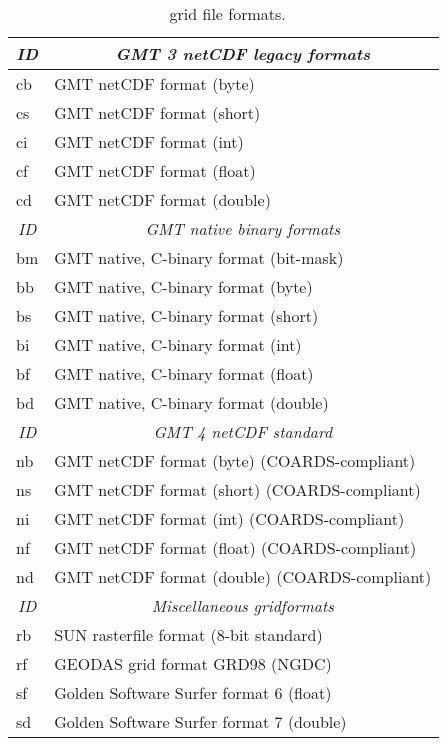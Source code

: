 \begin{table}[H]
\centering
\begin{tabular}{|l|l|} \hline
\multicolumn{1}{|c|}{\emph{ID}}	&	\multicolumn{1}{c|}{\emph{GMT 3 netCDF legacy formats}} \\ \hline \hline
cb & GMT netCDF format (byte)	 \\ \hline
cs & GMT netCDF format (short)	 \\ \hline
ci & GMT netCDF format (int)	 \\ \hline
cf & GMT netCDF format (float)	 \\ \hline
cd & GMT netCDF format (double)	 \\ \hline \hline
\multicolumn{1}{|c|}{\emph{ID}}	&	\multicolumn{1}{c|}{\emph{GMT native binary formats}} \\ \hline \hline
bm & GMT native, C-binary format (bit-mask)	\\ \hline
bb & GMT native, C-binary format (byte)		\\ \hline
bs & GMT native, C-binary format (short)	\\ \hline
bi & GMT native, C-binary format (int)		\\ \hline
bf & GMT native, C-binary format (float)	\\ \hline
bd & GMT native, C-binary format (double)	\\ \hline \hline
\multicolumn{1}{|c|}{\emph{ID}}	&	\multicolumn{1}{c|}{\emph{GMT 4 netCDF standard}} \\ \hline \hline
nb & GMT netCDF format (byte)   (COARDS-compliant)		\\ \hline
ns & GMT netCDF format (short)  (COARDS-compliant)		\\ \hline
ni & GMT netCDF format (int)    (COARDS-compliant)		\\ \hline
nf & GMT netCDF format (float)  (COARDS-compliant)		\\ \hline
nd & GMT netCDF format (double) (COARDS-compliant) 		\\ \hline \hline
\multicolumn{1}{|c|}{\emph{ID}}	&	\multicolumn{1}{c|}{\emph{Miscellaneous gridformats}} \\ \hline \hline
rb & SUN rasterfile format (8-bit standard)	\\ \hline
rf & GEODAS grid format GRD98 (NGDC)		\\ \hline
sf & Golden Software Surfer format 6 (float)	\\ \hline
sd & Golden Software Surfer format 7 (double)	\\ \hline
\end{tabular}
\caption{\gmt\ grid file formats.}
\label{tbl:grdformats}
\end{table}

